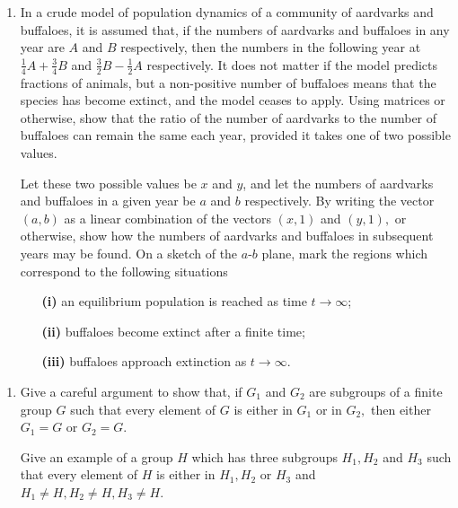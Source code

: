 \documentclass[a4, 11pt]{report}
\newlength{\qspace}
\newcounter{qnumber}
\newenvironment{question}%
 {\vspace{\qspace}
  \begin{enumerate}[\bfseries 1\quad][10]%
    \setcounter{enumi}{\value{qnumber}}%
    \item%
 }
{
  \end{enumerate}
  \filbreak
  \stepcounter{qnumber}
 }
\begin{document}
\begin{question}
In a crude model of population dynamics of a community of aardvarks
and buffaloes, it is assumed that, if the numbers of aardvarks and
buffaloes in any year are $A$ and $B$ respectively, then the numbers
in the following year at $\frac{1}{4}A+\frac{3}{4}B$ and $\frac{3}{2}B-\frac{1}{2}A$
respectively. It does not matter if the model predicts fractions of
animals, but a non-positive number of buffaloes means that the species
has become extinct, and the model ceases to apply. Using matrices
or otherwise, show that the ratio of the number of aardvarks to the
number of buffaloes can remain the same each year, provided it takes
one of two possible values. 


Let these two possible values be $x$ and $y$, and let the numbers
of aardvarks and buffaloes in a given year be $a$ and $b$ respectively.
By writing the vector $(a,b)$ as a linear combination of the vectors
$(x,1)$ and $(y,1),$ or otherwise, show how the numbers of aardvarks
and buffaloes in subsequent years may be found. On a sketch of the
$a$-$b$ plane, mark the regions which correspond to the following
situations 
\begin{itemize}
 \setlength{\itemsep}{3mm}
\item[\bf (i)] an equilibrium population is reached as time $t\rightarrow\infty$; 
\item[\bf (ii)] buffaloes become extinct after a finite time; 
\item[\bf (iii)] buffaloes approach extinction as $t\rightarrow\infty.$ 
\end{itemize}
\end{question}
		
		
\begin{question}
Give a careful argument to show that, if $G_{1}$ and $G_{2}$ are
subgroups of a finite group $G$ such that every element of $G$ is
either in $G_{1}$ or in $G_{2},$ then either $G_{1}=G$ or $G_{2}=G$. 


Give an example of a group $H$ which has three subgroups $H_{1},H_{2}$
and $H_{3}$ such that every element of $H$ is either in $H_{1},H_{2}$
or $H_{3}$ and $H_{1}\neq H,H_{2}\neq H,H_{3}\neq H$. 
\end{question}
		
\end{document}
